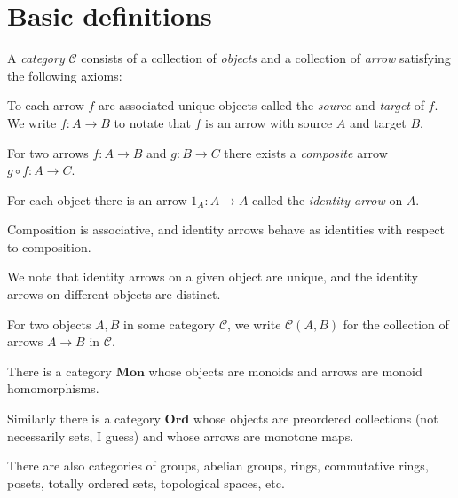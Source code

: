 \documentclass[article, a4paper, 11pt, oneside]{memoir}
\title{\doctitle}
\author{\docauthor}
\numberwithin{equation}{chapter}
\newcommand{\cat}[1]{\mathcal{#1}}
\newcommand{\ncat}[1]{\mathbf{#1}} %
\newcommand{\catMon}{\ncat{Mon}}
\newcommand{\catOrd}{\ncat{Ord}}
\newcommand{\catC}{\cat{C}}
\begin{document}
\maketitle

\chapter{Basic definitions}

\begin{definition}[Categories]
    A \emph{category} $\catC$ consists of a collection of \emph{objects} and a collection of \emph{arrow} satisfying the following axioms:
    \begin{enumdef}
        \item To each arrow $f$ are associated unique objects called the \emph{source} and \emph{target} of $f$. We write $f \colon A \to B$ to notate that $f$ is an arrow with source $A$ and target $B$.
        
        \item For two arrows $f \colon A \to B$ and $g \colon B \to C$ there exists a \emph{composite} arrow $g \circ f \colon A \to C$.
        
        \item For each object there is an arrow $1_A \colon A \to A$ called the \emph{identity arrow} on $A$.
        
        \item Composition is associative, and identity arrows behave as identities with respect to composition.
    \end{enumdef}
\end{definition}
%
We note that identity arrows on a given object are unique, and the identity arrows on different objects are distinct.

For two objects $A,B$ in some category $\catC$, we write $\catC(A,B)$ for the collection of arrows $A \to B$ in $\catC$.%

\begin{examplebreak}
    \begin{enumexample}
        \item \label{test} There is a category $\catMon$ whose objects are monoids and arrows are monoid homomorphisms.
        
        \item Similarly there is a category $\catOrd$ whose objects are preordered collections (not necessarily sets, I guess) and whose arrows are monotone maps.
        
        \item There are also categories of groups, abelian groups, rings, commutative rings, posets, totally ordered sets, topological spaces, etc.
    \end{enumexample}
\end{examplebreak}
\end{document}
